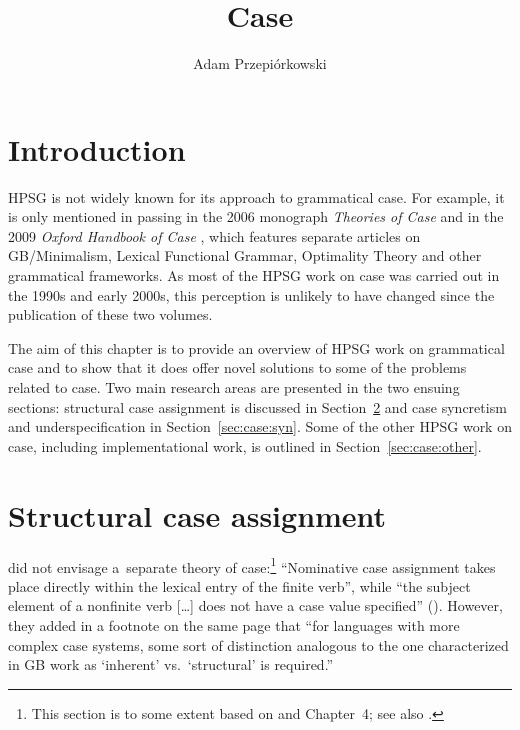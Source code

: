 \documentclass[output=paper
 	        ,biblatex
                ,babelshorthands
                ,newtxmath
                ,draftmode
                ,colorlinks, citecolor=brown
]{langscibook}
\author{%
	Adam Przepiórkowski\affiliation{University of Warsaw and Polish Academy of Sciences}%
}
\title{Case}
\begin{document}
\maketitle
\label{chap-case}


\section{Introduction}

HPSG is not widely known for its approach to grammatical case.  For example, it is only mentioned in passing in the 2006 monograph \emph{Theories of Case} \citep[225]{butt:06} and in the 2009 \emph{Oxford Handbook of Case} \citep[43]{mal:spe:09}, which features separate articles on GB/Minimalism, Lexical Functional Grammar, Optimality Theory and other grammatical frameworks.  As most of the HPSG work on case was carried out in the 1990s and early 2000s, this perception is unlikely to have changed since the publication of these two volumes.

The aim of this chapter is to provide an overview of HPSG work on grammatical case and to show that it does offer novel solutions to some of the problems related to case.  Two main research areas are presented in the two ensuing sections: structural case assignment is discussed in Section~\ref{sec:case:str} and case syncretism and underspecification in Section~\ref{sec:case:syn}.  Some of the other HPSG work on case, including implementational work, is outlined in Section~\ref{sec:case:other}.  %


\section{Structural case assignment}
\label{sec:case:str}

\citet{ps2} did not envisage a~separate theory of case:\footnote{This section is to some extent based on \citet[Section~3.4]{Prze99b} and Chapter~4; see also \citet[Chapter~14]{MuellerLehrbuch3}.} “Nominative case assignment takes place directly within the lexical entry of the finite verb”, while “the subject  element of a nonfinite verb […] does not have a case value specified” ().  However, they added in a footnote on the same page that “for languages with more complex case systems, some sort of distinction analogous to the one characterized in GB work as `inherent' vs.~`structural' is required.”  
\end{document}

